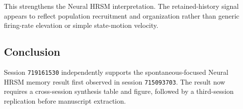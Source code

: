 This strengthens the Neural HRSM interpretation. The retained-history signal appears to reflect population recruitment and organization rather than generic firing-rate elevation or simple state-motion velocity.

\subsection{Conclusion}

Session \texttt{719161530} independently supports the spontaneous-focused Neural HRSM memory result first observed in session \texttt{715093703}. The result now requires a cross-session synthesis table and figure, followed by a third-session replication before manuscript extraction.
